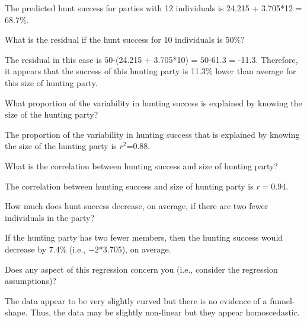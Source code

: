 \documentclass[10pt,openany]{book}\usepackage[]{graphicx}\usepackage[]{color}
\begin{document}
\begin{QAlist}
  \begin{QAlist}
    \item The predicted hunt success for parties with 12 individuals is 24.215 + 3.705*12 = 68.7\%.
  \end{QAlist}
  \item What is the residual if the hunt success for 10 individuals is 50\%?
  \begin{QAlist}
    \item The residual in this case is $50$-(24.215 + 3.705*10) = $50$-61.3 = -11.3. Therefore, it appears that the success of this hunting party is 11.3\% lower than average for this size of hunting party.
  \end{QAlist}
  \item What proportion of the variability in hunting success is explained by knowing the size of the hunting party?
  \begin{QAlist}
    \item The proportion of the variability in hunting success that is explained by knowing the size of the hunting party is $r^{2}$=0.88.
  \end{QAlist}
  \item What is the correlation between hunting success and size of hunting party?
  \begin{QAlist}
    \item The correlation between hunting success and size of hunting party is $r=$0.94.
  \end{QAlist}
  \item How much does hunt success decrease, on average, if there are two fewer individuals in the party?
  \begin{QAlist}
    \item If the hunting party has two fewer members, then the hunting success would decrease by 7.4\% (i.e., $-2$*3.705), on average.
  \end{QAlist}
  \item Does any aspect of this regression concern you (i.e., consider the regression assumptions)?
  \begin{QAlist}
    \item The data appear to be very slightly curved but there is no evidence of a funnel-shape. Thus, the data may be slightly non-linear but they appear homoscedastic.
  \end{QAlist}
\end{QAlist}

\end{document}
